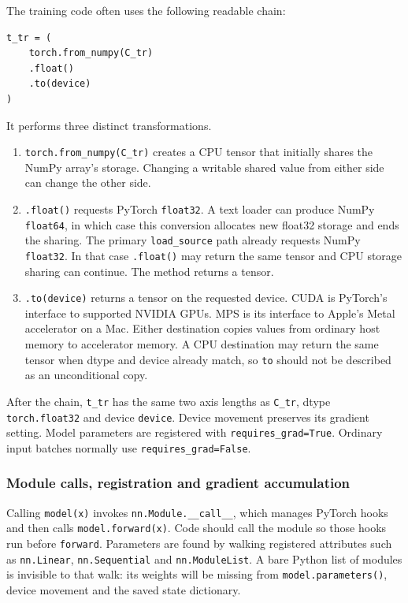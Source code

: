 \documentclass[10pt,aps,prd,twocolumn,nofootinbib]{revtex4-2}
\newcommand{\code}[1]{\texttt{#1}}
\begin{document}
The training code often uses the following readable chain:
\begin{verbatim}
t_tr = (
    torch.from_numpy(C_tr)
    .float()
    .to(device)
)
\end{verbatim}
It performs three distinct transformations.
\begin{enumerate}
  \item \code{torch.from\_numpy(C\_tr)} creates a CPU tensor that initially
        shares the NumPy array's storage.  Changing a writable shared value
        from either side can change the other side.
  \item \code{.float()} requests PyTorch \code{float32}.  A text loader
        can produce NumPy \code{float64}, in which case this conversion
        allocates new float32 storage and ends the sharing.  The primary
        \code{load\_source} path already requests NumPy \code{float32}.  In
        that case \code{.float()} may return the same tensor and CPU storage
        sharing can continue.  The method returns a tensor.
  \item \code{.to(device)} returns a tensor on the requested device.  CUDA is
        PyTorch's interface to supported NVIDIA GPUs.  MPS is its interface to
        Apple's Metal accelerator on a Mac.  Either destination copies values
        from ordinary host memory to accelerator memory.  A CPU
        destination may return the same tensor when dtype and device already
        match, so \code{to} should not be described as an unconditional copy.
\end{enumerate}
After the chain, \code{t\_tr} has the same two axis lengths as
\code{C\_tr}, dtype \code{torch.float32} and device \code{device}.  Device
movement preserves its gradient setting.  Model parameters are
registered with \code{requires\_grad=True}.  Ordinary input batches normally
use \code{requires\_grad=False}.

\subsubsection{Module calls, registration and gradient accumulation}

Calling \code{model(x)} invokes \code{nn.Module.\_\_call\_\_}, which manages
PyTorch hooks and then calls \code{model.forward(x)}.  Code should call the
module so those hooks run before \code{forward}.  Parameters are found by
walking registered attributes such as \code{nn.Linear},
\code{nn.Sequential} and \code{nn.ModuleList}.  A bare Python list of
modules is invisible to that walk: its weights will be missing from
\code{model.parameters()}, device movement and the saved state dictionary.
\end{document}
